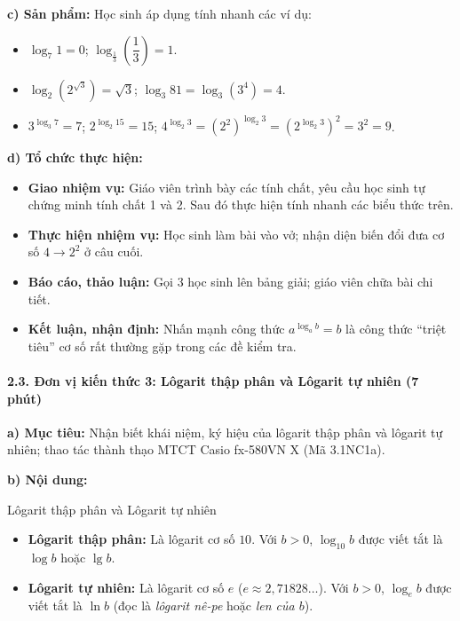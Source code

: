 \documentclass[12pt, a4paper]{article}
\begin{document}
\noindent \textbf{c) Sản phẩm:}
Học sinh áp dụng tính nhanh các ví dụ:
\begin{itemize}
    \item $\log_7 1 = 0$; $\log_{\frac{1}{3}} \left(\dfrac{1}{3}\right) = 1$.
    \item $\log_2 (2^{\sqrt{3}}) = \sqrt{3}$; $\log_3 81 = \log_3 (3^4) = 4$.
    \item $3^{\log_3 7} = 7$; $2^{\log_2 15} = 15$; $4^{\log_2 3} = (2^2)^{\log_2 3} = (2^{\log_2 3})^2 = 3^2 = 9$.
\end{itemize}

\noindent \textbf{d) Tổ chức thực hiện:}
\begin{itemize}[leftmargin=0.6cm]
    \item \textbf{Giao nhiệm vụ:} Giáo viên trình bày các tính chất, yêu cầu học sinh tự chứng minh tính chất 1 và 2. Sau đó thực hiện tính nhanh các biểu thức trên.
    \item \textbf{Thực hiện nhiệm vụ:} Học sinh làm bài vào vở; nhận diện biến đổi đưa cơ số $4 \to 2^2$ ở câu cuối.
    \item \textbf{Báo cáo, thảo luận:} Gọi 3 học sinh lên bảng giải; giáo viên chữa bài chi tiết.
    \item \textbf{Kết luận, nhận định:} Nhấn mạnh công thức $a^{\log_a b} = b$ là công thức “triệt tiêu” cơ số rất thường gặp trong các đề kiểm tra.
\end{itemize}

\paragraph{2.3. Đơn vị kiến thức 3: Lôgarit thập phân và Lôgarit tự nhiên (7 phút)}

\noindent \textbf{a) Mục tiêu:}
Nhận biết khái niệm, ký hiệu của lôgarit thập phân và lôgarit tự nhiên; thao tác thành thạo MTCT Casio fx-580VN X (Mã 3.1NC1a).

\noindent \textbf{b) Nội dung:}
\begin{pedabox}{Lôgarit thập phân và Lôgarit tự nhiên}
\begin{itemize}[leftmargin=0.6cm]
    \item \textbf{Lôgarit thập phân:} Là lôgarit cơ số $10$. Với $b > 0$, $\log_{10} b$ được viết tắt là $\log b$ hoặc $\lg b$.
    \item \textbf{Lôgarit tự nhiên:} Là lôgarit cơ số $e$ ($e \approx 2{,}71828\dots$). Với $b > 0$, $\log_e b$ được viết tắt là $\ln b$ (đọc là \textit{lôgarit nê-pe} hoặc \textit{len của $b$}).
\end{itemize}
\end{pedabox}
\end{document}
